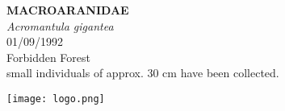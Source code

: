 \documentclass[
  landscape]{article}
\begin{document}
\begin{mdframed}[linecolor=mycolortext, linewidth=2pt, backgroundcolor=mycolor]

  \bigskip
  \begin{flushright}
  \begin{minipage}[t][-50ex][t]{16em}  
  \end{minipage}
  \end{flushright}
  \bigskip
  \begin{adjustwidth}{1cm}{1cm}
  {\fontsize{50pt}{0pt}\selectfont\bf\textcolor{mycolortext}{ MACROARANIDAE }} \\
  \linebreak
  \linebreak
  {\fontsize{40pt}{100pt}\selectfont\textcolor{mycolortext}{\emph{ Acromantula gigantea }}} \\
  \vfill
  {\fontsize{30pt}{100pt}\selectfont\textcolor{mycolortext}{ 01/09/1992 }} \\
  \vfill
  {\fontsize{30pt}{100pt}\selectfont\textcolor{mycolortext}{ Forbidden Forest }} \\
  \vfill
  {\fontsize{30pt}{50pt}\selectfont\textcolor{mycolortext}{ small individuals of approx. 30 cm have been collected. }} \\
  \end{adjustwidth}
  \begin{center}
  \texttt{[image: logo.png]}
  \end{center}
  \end{mdframed}
  \pagebreak

\end{document}
